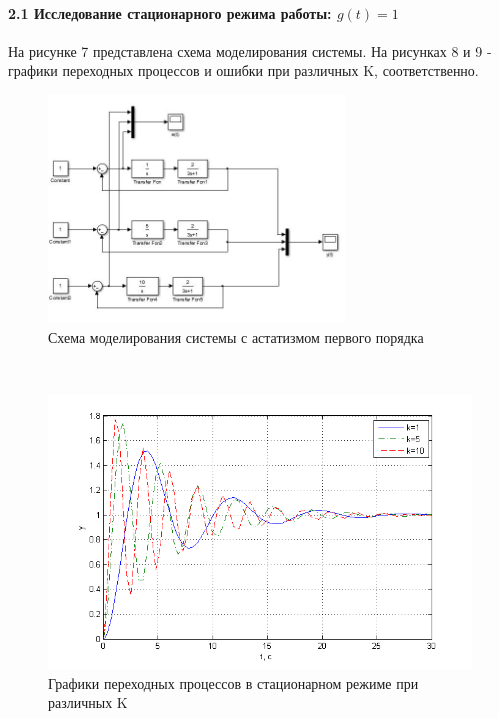 \documentclass[a4paper, 12pt]{article}
\begin{document}
\paragraph{2.1 Исследование стационарного режима работы: $g(t) = 1$}\hfill\par
На рисунке 7 представлена схема моделирования системы. На рисунках 8 и 9 - графики переходных процессов и ошибки при различных K, соответственно.
\begin{figure}[H]
	\centering
	\includegraphics[width = 0.7\textwidth]{sxema3}
	\caption{Схема моделирования системы с астатизмом первого порядка}
\end{figure}
\hfill\\
\begin{figure}[h]
	\centering
	\includegraphics[width = 1\textwidth]{hinh5}
	\caption{Графики переходных процессов в стационарном режиме при различных K}
\end{figure}
\end{document}
